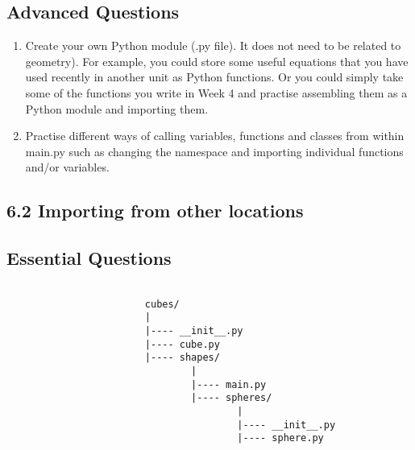 \documentclass[11pt]{report}
\begin{document}
\subsection*{Advanced Questions}

\begin{enumerate}[label=(\Alph*)]
    
    \item Create your own Python module (.py file). It does not need to be related to geometry). For example, you could store some useful equations that you have used recently in another unit as Python functions. Or you could simply take some of the functions you write in Week 4 and practise assembling them as a Python module and importing them.  
    \item Practise different ways of calling variables, functions and classes from within main.py such as changing the namespace and importing individual functions and/or variables. 
    
\end{enumerate}

\pagebreak

\subsection*{\Large 6.2 Importing from other locations}

\subsection*{Essential Questions}

\begin{verbatim}

                        cubes/
                        |
                        |---- __init__.py
                        |---- cube.py
                        |---- shapes/
                                |
                                |---- main.py
                                |---- spheres/
                                        |
                                        |---- __init__.py
                                        |---- sphere.py
                                        
\end{verbatim}

\end{document}
